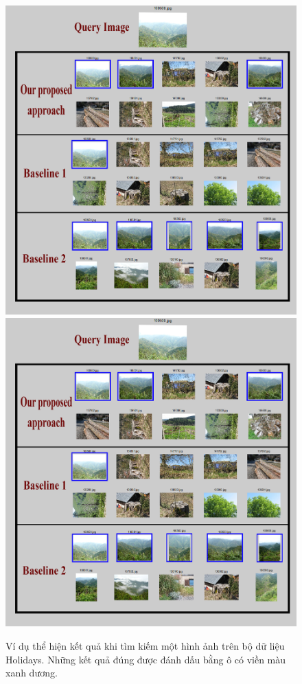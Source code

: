 \begin{figure}[!htbp]
  \begin{center}
    \leavevmode
    \ifpdf
      \includegraphics[scale=0.2]{resHolidays}
    \else
      \includegraphics[scale=0.2]{resHolidays}
    \fi
    \caption[Ví dụ thể hiện kết quả khi tìm kiếm một hình ảnh trên bộ dữ liệu Holidays]{Ví dụ thể hiện kết quả khi tìm kiếm một hình ảnh trên bộ dữ liệu Holidays. Những kết quả đúng được đánh dấu bằng ô có viền màu xanh dương.}
    \label{FigResultsHolidays}
  \end{center}
\end{figure}
